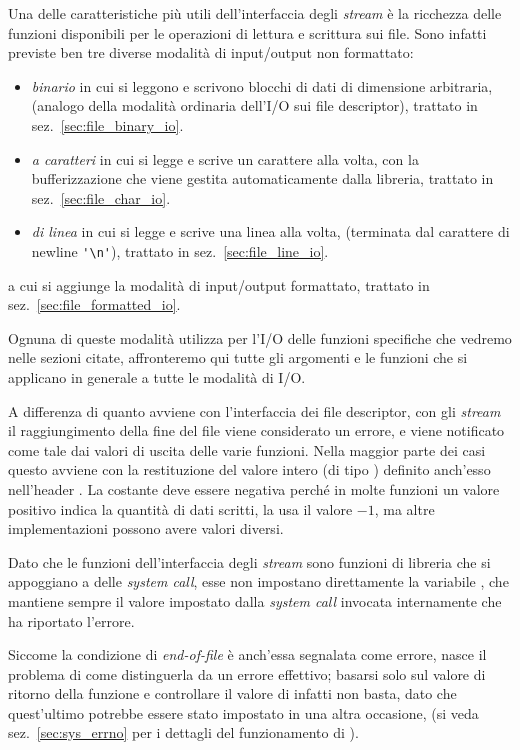 Una delle caratteristiche più utili dell'interfaccia degli \textit{stream} è
la ricchezza delle funzioni disponibili per le operazioni di lettura e
scrittura sui file. Sono infatti previste ben tre diverse modalità di
input/output non formattato:
\begin{itemize}
\item\textsl{binario} in cui si leggono e scrivono blocchi di dati di
   dimensione arbitraria, (analogo della modalità ordinaria dell'I/O sui file
   descriptor), trattato in sez.~\ref{sec:file_binary_io}.
\item\textsl{a caratteri} in cui si legge e scrive un carattere alla volta,
   con la bufferizzazione che viene gestita automaticamente dalla libreria,
   trattato in sez.~\ref{sec:file_char_io}.
\item\textsl{di linea} in cui si legge e scrive una linea alla volta,
   (terminata dal carattere di newline \verb|'\n'|), trattato in
   sez.~\ref{sec:file_line_io}.
\end{itemize}
a cui si aggiunge la modalità di input/output formattato, trattato in
sez.~\ref{sec:file_formatted_io}.

Ognuna di queste modalità utilizza per l'I/O delle funzioni specifiche che
vedremo nelle sezioni citate, affronteremo qui tutte gli argomenti e le
funzioni che si applicano in generale a tutte le modalità di I/O.

A differenza di quanto avviene con l'interfaccia dei file descriptor, con gli
\textit{stream} il raggiungimento della fine del file viene considerato un
errore, e viene notificato come tale dai valori di uscita delle varie
funzioni. Nella maggior parte dei casi questo avviene con la restituzione del
valore intero (di tipo )  definito anch'esso nell'header
. La costante deve essere negativa perché in molte funzioni
un valore positivo indica la quantità di dati scritti, la  usa il
valore $-1$, ma altre implementazioni possono avere valori diversi.

Dato che le funzioni dell'interfaccia degli \textit{stream} sono funzioni di
libreria che si appoggiano a delle \textit{system call}, esse non impostano
direttamente la variabile , che mantiene sempre il valore impostato
dalla \textit{system call} invocata internamente che ha riportato l'errore.

Siccome la condizione di \textit{end-of-file} è anch'essa segnalata come
errore, nasce il problema di come distinguerla da un errore effettivo; basarsi
solo sul valore di ritorno della funzione e controllare il valore di
 infatti non basta, dato che quest'ultimo potrebbe essere stato
impostato in una altra occasione, (si veda sez.~\ref{sec:sys_errno} per i
dettagli del funzionamento di ).

